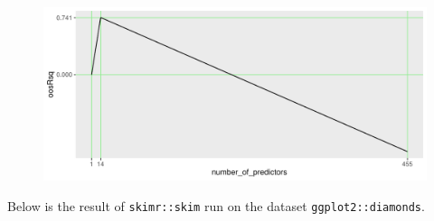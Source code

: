 \documentclass[12pt]{article}
\begin{document}
\begin{figure}[htp]
\centering
\includegraphics[width=5.0in]{out_of_sample}
\end{figure}
\eenum



\problem Below is the result of \texttt{skimr::skim} run on the dataset \texttt{ggplot2::diamonds}.

%
%
%
%
%
%  
%
\end{document}
